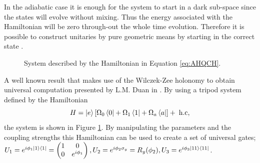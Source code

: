 In the adiabatic case it is enough for the system to start in a dark sub-space since the states will evolve without mixing. Thus the energy associated with the Hamiltonian will be zero through-out the whole time evolution. Therefore it is possible to construct unitaries by pure geometric means by starting in the correct state \cite{adiabatensatz,AHQC}.

\begin{figure}[H]
\begin{center}
    \caption{System described by the Hamiltonian in Equation \ref{eq:AHQCH}.} 
     \label{fig:HamAH}
    \end{center}

\end{figure}
A well known result that makes use of the Wilczek-Zee holonomy to obtain universal computation presented by L.M. Duan in \cite{AHQC}. By using a tripod system defined by the Hamiltonian
\begin{equation}
\label{eq:AHQCH}
H = \ket{e}[\Omega_0\bra{0} + \Omega_1\bra{1} + \Omega_a\bra{a}] + \;\text{h.c},
\end{equation}
the system is shown in Figure \ref{fig:HamAH}. By manipulating the parameters and the coupling strengths this Hamiltonian can be used to create a set of universal gates; $U_1 = e^{i\phi_1\ket{1}\bra{1}} = \begin{pmatrix}
1 & 0\\
0 & e^{i\phi_1}
\end{pmatrix}, U_2 =  e^{i\phi_2\sigma_y} = R_y(\phi_2), U_3 =  e^{i\phi_3\ket{11}\bra{11}}$.
